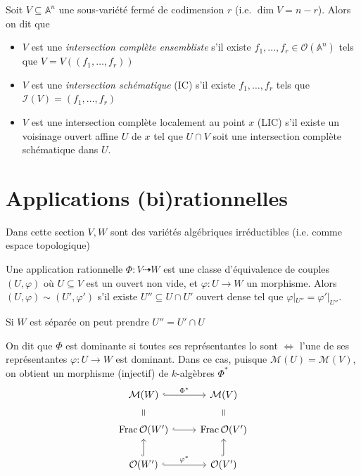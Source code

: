 \begin{definition}{}
    Soit \(V \subseteq \mathbb{A} ^{n}\) une sous-variété fermé de codimension
    \(r\) (i.e. \(\dim V = n - r\)). Alors on dit que
\begin{itemize}[label = --]
    \item \(V\) est une \emph{intersection complète ensembliste} s'il existe
        \(f_{1}, \dots, f_{r} \in \mathcal{O}{(\mathbb{A}^{n})}\) tels que \(V =
        V{({(f_{1}, \dots, f_r)})}\) 
    \item \(V\) est une \emph{intersection schématique} (IC) s'il existe \(f_{1},
        \dots, f_r\) tels que \(\mathcal{I}{(V)} = (f_{1},\dots, f_r)\) 
    \item \(V\) est une intersection complète localement au point \(x\) (LIC)
        s'il existe un voisinage ouvert affine \(U\) de \(x\) tel que \(U \cap
        V\) soit une intersection complète schématique dans \(U\).
\end{itemize}

\end{definition}

\section{Applications (bi)rationnelles}

Dans cette section \(V, W\) sont des variétés algébriques irréductibles (i.e.
comme espace topologique)

\begin{definition}{}
    Une application rationnelle
    \(
      \Phi  : V \dashrightarrow W
    \) est une classe d'équivalence de couples \({(U, \varphi )}\) où \(U
    \subseteq V \) est un ouvert non vide, et \(\varphi : U \to W\) un
    morphisme. Alors \({(U, \varphi)} \sim {(U', \varphi ')}\) s'il existe \(U''
    \subseteq U \cap U' \) ouvert dense tel que \(\varphi|_{U''} =
    \varphi'|_{U''} \).
\end{definition}
\begin{remark}{}
    Si \(W\) est séparée on peut prendre \(U'' = U' \cap U\) 
\end{remark}
On dit que \(\Phi\) est dominante si toutes ses représentantes lo sont
\(\iff\) l'une de ses représentantes \(\varphi  : U \to W\) est dominant. Dans
ce cas, puisque \(\mathcal{M}{(U)} = \mathcal{M}{(V)}\), on obtient un morphisme
(injectif) de \(k\)-algèbres \(\Phi^{*}\) 
\[
\begin{tikzcd}
	\mathcal{M}{(W)} & \mathcal{M}{(V)} \\
	\mathrm{Frac}\, \mathcal{O}{(W')} & \mathrm{Frac}\, \mathcal{O}{(V')} \\
	\mathcal{O}{(W')} & \mathcal{O}{(V')}
	\arrow["{\Phi^*}", hook, from=1-1, to=1-2]
	\arrow["{=}"{marking, allow upside down}, draw=none, from=1-1, to=2-1]
	\arrow["{=}"{marking, allow upside down}, draw=none, from=1-2, to=2-2]
	\arrow[hook, from=2-1, to=2-2]
	\arrow[hook, from=3-1, to=2-1]
	\arrow["{\varphi^*}", hook, from=3-1, to=3-2]
	\arrow[hook, from=3-2, to=2-2]
\end{tikzcd}
\]

